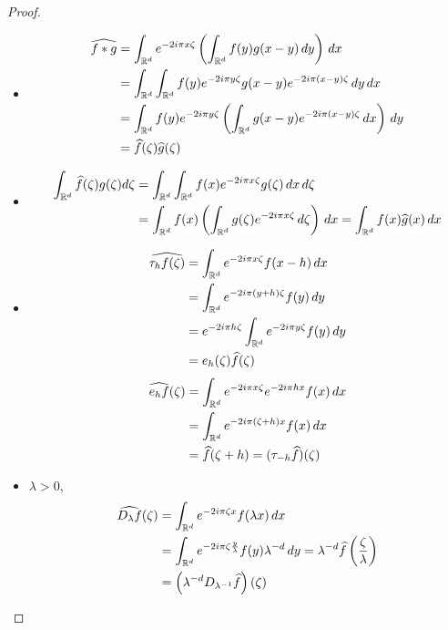 \documentclass[]{report}
\begin{document}
    \begin{proof}
        \begin{itemize}
            \item \begin{align*}
                \widehat{f*g}&=\int_{\mathbb{R}^d} e^{-2i\pi x\zeta}\left(\int_{\mathbb{R}^d} f(y)g(x-y)\, dy\right)\, dx\\
                &=\int_{\mathbb{R}^d}\int_{\mathbb{R}^d}f(y)e^{-2i\pi y\zeta}g(x-y)e^{-2i\pi(x-y)\zeta}\,dy\, dx\\
                &=\int_{\mathbb{R}^d}f(y)e^{-2i\pi y\zeta}\left(\int_{\mathbb{R}^d}g(x-y)e^{-2i\pi (x-y)\zeta}\, dx\right)\, dy\\
                &=\widehat{f}(\zeta)\widehat{g}(\zeta)
            \end{align*}
            \item \begin{align*}
                \int_{\mathbb{R}^d}\widehat{f}(\zeta)g(\zeta)d\zeta&=\int_{\mathbb{R}^d}\int_{\mathbb{R}^d} f(x) e^{-2i\pi x\zeta}g(\zeta)\, dx\, d\zeta\\
                &= \int_{\mathbb{R}^d} f(x)\left(\int_{\mathbb{R}^d} g(\zeta)e^{-2i\pi x\zeta}\, d\zeta\right)\, dx=\int_{\mathbb{R}^d}f(x)\widehat{g}(x)\, dx
            \end{align*}
            \item \begin{align*}
                \widehat{\tau_h f(\zeta)}&=\int_{\mathbb{R}^d} e^{-2i\pi x\zeta} f(x-h)\, dx\\
                &=\int_{\mathbb{R}^d} e^{-2i\pi (y+h)\zeta} f(y)\, dy\\
                &=e^{-2i\pi h \zeta}\int_{\mathbb{R}^d}e^{-2i\pi y\zeta}f(y)\, dy\\
                &=e_h(\zeta)\widehat{f}(\zeta)
            \end{align*}
            \begin{align*}
                \widehat{e_h f}(\zeta)&=\int_{\mathbb{R}^d}e^{-2i\pi x\zeta}e^{-2i\pi hx} f(x)\, dx\\
                &=\int_{\mathbb{R}^d} e^{-2i\pi(\zeta+h)x}f(x)\, dx\\
                &=\widehat{f}(\zeta+h)=(\tau_{-h}\widehat{f})(\zeta)
            \end{align*}
            \item $\lambda>0$,
            \begin{align*}
                \widehat{D_\lambda f}(\zeta)&=\int_{\mathbb{R}^d}e^{-2i\pi\zeta x}f(\lambda x)\, dx\\
                &=\int_{\mathbb{R}^d}e^{-2i\pi \zeta\frac{y}{\lambda}} f(y)\lambda^{-d}\, dy=\lambda^{-d} \widehat{f}\left( \frac{\zeta}{\lambda}\right)\\
                &=\left(\lambda^{-d}D_{\lambda^{-1}}\widehat{f}\right)(\zeta)
            \end{align*}
        \end{itemize}
    \end{proof}
\end{document}

